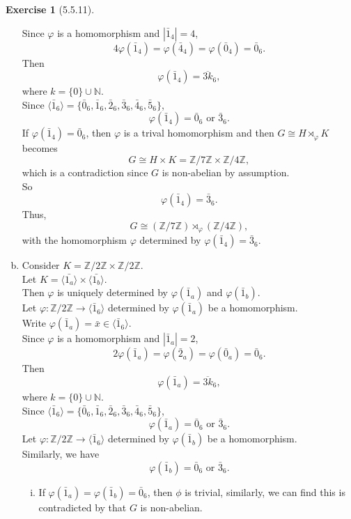 \documentclass{amsart}
\newcommand{\bbz}{\mathbb{Z}}
\newcommand{\bbn}{\mathbb{N}}
\theoremstyle{plain}
\theoremstyle{definition}
\newtheorem{exer}[lem]{Exercise}
\begin{document}
\begin{exer}[5.5.11]
\begin{enumerate}[(a)]
	  Since $\varphi$ is a homomorphism and $|\bar{1}_4| = 4$,
  	  \[4\varphi(\bar{1}_4) = \varphi(\bar{4}_4) = \varphi(\bar{0}_4) = \bar{0}_6.\]
  	  Then  
  	  \[\varphi(\bar{1}_4) =\overline{3k}_6, \]
  	  where $k=\{0\} \cup \bbn$.\\
	  Since $\langle \bar{1}_6 \rangle = \{\bar{0}_6,\bar{1}_6,\bar{2}_6,\bar{3}_6,\bar{4}_6,\bar{5}_6\}$,
	  \[\varphi(\bar{1}_4) = \bar{0}_6 \text{ or } \bar{3}_6.\]
	  If $\varphi(\bar{1}_4) = \bar{0}_6$, then $\varphi$ is a trival homomorphism and then $G \cong H \rtimes_\varphi K$ becomes 
	  \[G \cong H \times K = \bbz/7\bbz \times \bbz/4\bbz,\]
	  which is a contradiction since $G$ is non-abelian by assumption.\\
	  So 
	  \[\varphi(\bar{1}_4) = \bar{3}_6.\]
	Thus, 
	\[G \cong ( \bbz/7\bbz) \rtimes_\varphi ( \bbz/4\bbz),\]
	with the homomorphism $\varphi$ determined by $\varphi(\bar{1}_4) = \bar{3}_6$.\\
	\item Consider $K = \bbz/2\bbz \times \bbz/2\bbz$.\\
	  Let $K=\langle \bar{1_a} \rangle \times \langle \bar{1_b} \rangle$.\\
	Then $\varphi$ is uniquely determined by $\varphi(\bar{1}_a)$ and $\varphi(\bar{1}_b)$.\\
	Let $\varphi:  \bbz/2\bbz \to \langle \bar{1}_6 \rangle$ determined by $\varphi(\bar{1}_a)$ be a homomorphism. \\
	Write $\varphi(\bar{1}_a) = \bar{x} \in \langle \bar{1}_6 \rangle $.\\
	  Since $\varphi$ is a homomorphism and $|\bar{1}_a| = 2$,
  	  \[2\varphi(\bar{1}_a) = \varphi(\bar{2}_a) = \varphi(\bar{0}_a) = \bar{0}_6.\]
  	  Then  
  	  \[\varphi(\bar{1}_a) =\overline{3k}_6, \]
  	  where $k=\{0\} \cup \bbn$.\\
	  Since $\langle \bar{1}_6 \rangle = \{\bar{0}_6,\bar{1}_6,\bar{2}_6,\bar{3}_6,\bar{4}_6,\bar{5}_6\}$,
	  \[\varphi(\bar{1}_a) = \bar{0}_6 \text{ or } \bar{3}_6.\]
	  Let $\varphi:  \bbz/2\bbz \to \langle \bar{1}_6 \rangle$ determined by $\varphi(\bar{1}_b)$ be a homomorphism.\\
	  Similarly, we have
		\[\varphi(\bar{1}_b) = \bar{0}_6 \text{ or } \bar{3}_6.\]
	  \begin{enumerate}[(i)]
		\item
		  If $\varphi(\bar{1}_a) = \varphi(\bar{1}_b) = \bar{0}_6$, then $\phi$ is trivial, similarly, we can find this is contradicted by that $G$ is non-abelian.\\

\end{enumerate}
\end{enumerate}
\end{exer}
\end{document}
